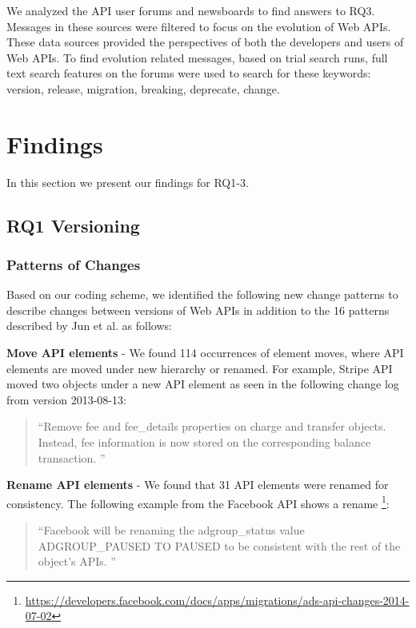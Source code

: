\documentclass[conference]{IEEEtran}
\begin{document}
We analyzed the API user forums and newsboards to find answers to RQ3. Messages in these sources were filtered to focus on the evolution of Web APIs. These data sources provided the perspectives of both the developers and users of Web APIs. To find evolution related messages, based on trial search runs, full text search features on the forums were used to search for these keywords: version, release, migration, breaking, deprecate, change.


\section{Findings} %
\label{sec:findings}

In this section we present our findings for RQ1-3.

\subsection{RQ1 Versioning} %
\label{sub:versioning}

\subsubsection{Patterns of Changes}

Based on our coding scheme, we identified the following new change patterns to describe changes between versions of Web APIs in addition to the 16 patterns described by Jun et al. \cite{li_client_2013} as follows:

\textbf{Move API elements} - We found 114 occurrences of element moves, where API elements are moved under new hierarchy or renamed. For example, Stripe API moved two objects under a new API element as seen in the following change log from version 2013-08-13:

\small
\begin{quotation}
``Remove fee and fee\_details properties on charge and transfer objects. Instead, fee information is now stored on the corresponding balance transaction.
''\end{quotation}
\normalsize

\textbf{Rename API elements} - We found that 31 API elements were renamed for consistency. The following example from the Facebook API shows a rename \footnote{\url{https://developers.facebook.com/docs/apps/migrations/ads-api-changes-2014-07-02}}:

\small
\begin{quotation}
``Facebook will be renaming the adgroup\_status value ADGROUP\_PAUSED TO PAUSED to be consistent with the rest of the object's APIs.
''\end{quotation}
\normalsize
\end{document}
